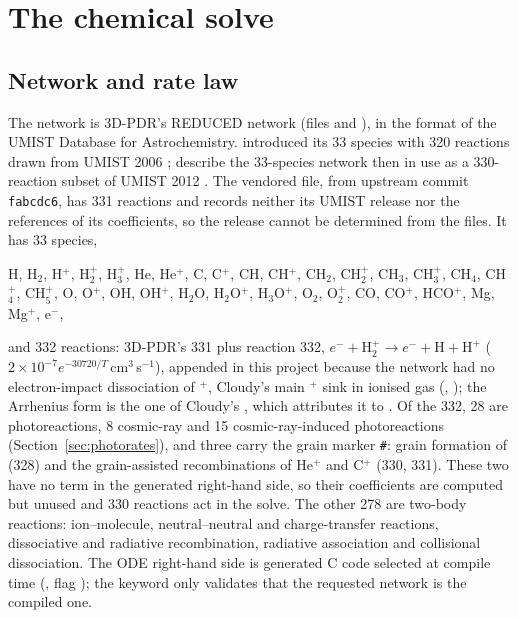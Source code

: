 \section{The chemical solve}
\label{sec:chemistry}

\subsection{Network and rate law}
\label{sec:network}

The network is 3D-PDR's REDUCED network (files
 and ), in the
format of the UMIST Database for Astrochemistry. \citet{Bisbas2012}
introduced its 33 species with 320 reactions drawn from UMIST 2006
\citep{Woodall2007}; \citet{Bisbas2015} describe the 33-species network then in
use as a 330-reaction subset of UMIST 2012 \citep{McElroy2013}. The vendored
file, from upstream commit \texttt{fabcdc6}, has 331 reactions and records
neither its UMIST release nor the references of its coefficients, so the
release cannot be determined from the files. It has 33 species,
\begin{center}
\small H, H$_2$, H$^+$, H$_2^+$, H$_3^+$, He, He$^+$, C, C$^+$, CH, CH$^+$,
CH$_2$, CH$_2^+$, CH$_3$, CH$_3^+$, CH$_4$, CH$_4^+$, CH$_5^+$, O, O$^+$, OH,
OH$^+$, H$_2$O, H$_2$O$^+$, H$_3$O$^+$, O$_2$, O$_2^+$, CO, CO$^+$, HCO$^+$, Mg,
Mg$^+$, e$^-$,
\end{center}
and 332 reactions: 3D-PDR's 331 plus reaction 332,
$e^-+\mathrm{H_2^+}\to e^-+\mathrm H+\mathrm H^+$ ($2\times10^{-7}e^{-30720/T}$\,cm$^3$\,s$^{-1}$),
appended in this project because the network had no
electron-impact dissociation of \Htwo$^+$, Cloudy's main \Htwo$^+$ sink in ionised
gas (, ); the Arrhenius form is the one of
Cloudy's , which attributes it to
\citet{Janev1987}. Of the 332, 28 are photoreactions, 8 cosmic-ray and 15
cosmic-ray-induced photoreactions (Section~\ref{sec:photorates}), and three
carry the grain marker \texttt{\#}: grain formation of \Htwo{} (328) and the
grain-assisted recombinations of He$^+$ and C$^+$ (330, 331). These two have no
term in the generated right-hand side, so their coefficients are computed but
unused and 330 reactions act in the solve. The other 278 are two-body reactions:
ion--molecule, neutral--neutral and charge-transfer reactions, dissociative and
radiative recombination, radiative association and collisional dissociation.
The ODE right-hand side is generated C code selected at compile time
(, flag ); the keyword 
only validates that the requested network is the compiled one.

